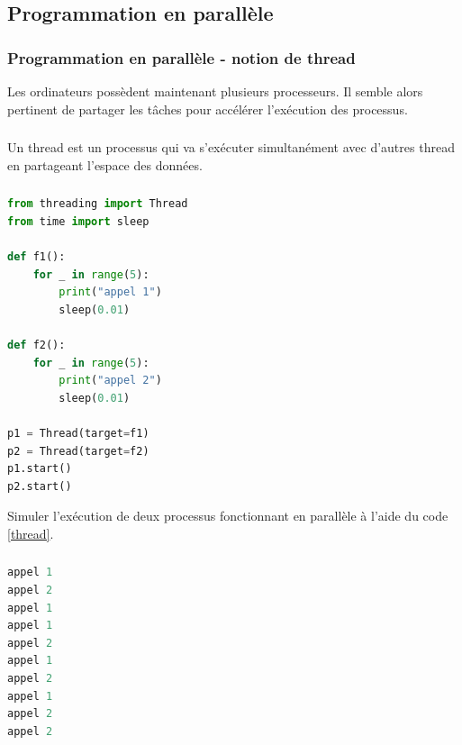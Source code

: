 \documentclass[svgnames,11pt]{beamer}
\begin{document}
\subsection{Programmation en parallèle}
\begin{frame}
    \frametitle{Programmation en parallèle - notion de \textbf{thread}}

    Les ordinateurs possèdent maintenant plusieurs processeurs. Il semble alors pertinent de partager les tâches pour accélérer l'exécution des processus.

\end{frame}
\begin{frame}
    \frametitle{}

    \begin{center}
        Un thread est un processus qui va s'exécuter simultanément avec d'autres thread en partageant l'espace des données.
    \end{center}

\end{frame}
\begin{frame}[fragile]
    \frametitle{}

    \begin{center}
        \begin{lstlisting}[language=Python , basicstyle=\ttfamily\small, xleftmargin=2em, xrightmargin=2em]
from threading import Thread
from time import sleep

def f1():
    for _ in range(5):
        print("appel 1")
        sleep(0.01)

def f2():
    for _ in range(5):
        print("appel 2")
        sleep(0.01)

p1 = Thread(target=f1)
p2 = Thread(target=f2)
p1.start()
p2.start()
\end{lstlisting}
        \label{thread}
    \end{center}
    \begin{activite}
        Simuler l'exécution de deux processus fonctionnant en parallèle à l'aide du code \ref{thread}.
    \end{activite}
\end{frame}
\begin{frame}[fragile]
    \frametitle{}

    \begin{center}
        \begin{lstlisting}[language=Python , basicstyle=\ttfamily\small, xleftmargin=2em, xrightmargin=2em]
appel 1
appel 2
appel 1
appel 1
appel 2
appel 1
appel 2
appel 1
appel 2
appel 2
\end{lstlisting}
    \end{center}
\end{frame}
\end{document}

